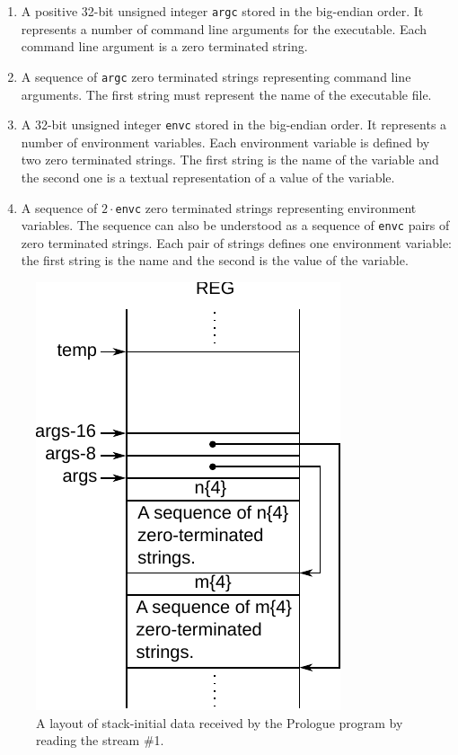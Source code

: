 \documentclass[10pt,twocolumn]{article}
\begin{document}
\begin{enumerate}
\item A positive 32-bit unsigned integer \texttt{argc} stored in the big-endian
order. It represents a number of command line arguments for the executable. Each
command line argument is a zero terminated string. %
\item A sequence of \texttt{argc} zero terminated strings representing command
line arguments. The first string must represent the name of the executable file.
%
\item A 32-bit unsigned integer \texttt{envc} stored in the big-endian order. It
represents a number of environment variables. Each environment variable is
defined by two zero terminated strings. The first string is the name of the
variable and the second one is a textual representation of a value of the
variable. %
\item A sequence of $ 2 \cdot $\texttt{envc} zero terminated strings
representing environment variables. The sequence can also be understood as a
sequence of \texttt{envc} pairs of zero terminated strings. Each pair of strings
defines one environment variable: the first string is the name and the second is
the value of the variable. %

\end{enumerate}

\begin{figure}[!h]
\begin{center}
\includegraphics{./fig_prologue_stack_init}
\end{center}
\caption{A layout of stack-initial data received by the Prologue program by reading the stream \#1.}
\label{fig:prologue_stack_init}
\end{figure}
\end{document}
